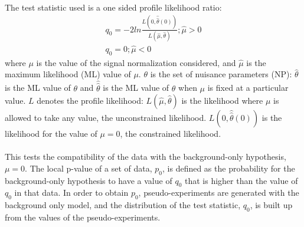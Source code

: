 \paragraph{}
The test statistic used is a one sided profile likelihood ratio:
\begin{eqnarray}
  {q_{0}} = -2 ln \frac{L(0,\hat{\hat{\theta}}(0))}{L(\hat{\mu},\hat{\theta})}; \hat{\mu} > 0 \\
  {q_{0}} =  0 ; \hat{\mu} < 0 
\end{eqnarray}
where $\mu$ is the value of the signal normalization considered, and $\hat{\mu}$ is the maximum likelihood (ML) value of $\mu$. 
$\theta$ is the set of nuisance parameters (NP): $\hat{\theta}$ is the ML value of $\theta$ and 
$\hat{\hat{\theta}}$ is the ML value of $\theta$ when $\mu$ is fixed at a particular value. 
$L$ denotes the profile likelihood: $L(\hat{\mu},\hat{\theta})$ is the likelihood where $\mu$ is allowed to take any value, the unconstrained likelihood. 
$L(0,\hat{\hat{\theta}}(0))$ is the likelihood for the value of $\mu = 0$, the constrained likelihood.

\paragraph{}
This tests the compatibility of the data with the background-only hypothesis, $\mu = 0$. 
The local p-value of a set of data, $p_0$, is defined as the probability for the 
background-only hypothesis to have a value of $q_0$ that is higher than the 
value of $q_{0}$ in that data.
In order to obtain $p_0$, pseudo-experiments are generated with the background only 
model, and the distribution of the test statistic, $q_{0}$, is built up from the 
values of the pseudo-experiments.


